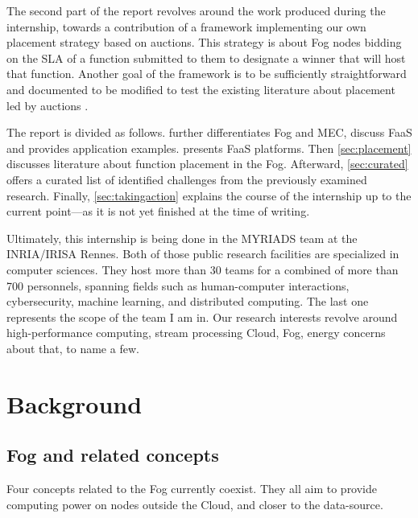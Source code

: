 The second part of the report revolves around the work produced during the internship, towards a contribution of a framework implementing our own placement strategy based on auctions. This strategy is about Fog nodes bidding on the \gls{SLA} of a function submitted to them to designate a winner that will host that function. Another goal of the framework is to be sufficiently straightforward and documented to be modified to test the existing literature about placement led by auctions \cite{bermbach_auctionwhisk_2021,tasiopoulos_fogspot_2019}.

The report is divided as follows.  further differentiates Fog and \gls{MEC}, discuss \gls{FaaS} and provides application examples.  presents \gls{FaaS} platforms. Then \cref{sec:placement} discusses literature about function placement in the Fog. Afterward, \cref{sec:curated} offers a curated list of identified challenges from the previously examined research. Finally, \cref{sec:takingaction} explains the course of the internship up to the current point—as it is not yet finished at the time of writing.

Ultimately, this internship is being done in the MYRIADS team at the INRIA/IRISA Rennes. Both of those public research facilities are specialized in computer sciences. They host more than 30 teams for a combined of more than 700 personnels, spanning fields such as human-computer interactions, cybersecurity, machine learning, and distributed computing. The last one represents the scope of the team I am in. Our research interests revolve around high-performance computing, stream processing Cloud, Fog, energy concerns about that, to name a few.

\section{Background}
\label{sec:background}

\subsection{Fog and related concepts}

Four concepts related to the Fog currently coexist. They all aim to provide computing power on nodes outside the Cloud, and closer to the data-source.

